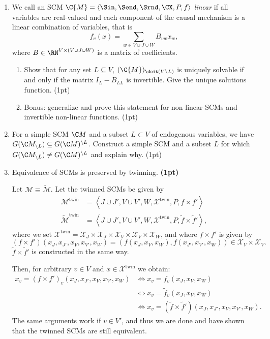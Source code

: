 \begin{enumerate}
\item We call an SCM $\C{M}=\langle \Sin, \Send, \Srnd, \CX, P, f \rangle$
\emph{linear} if all variables are real-valued and 
each component of the causal mechanism is a linear combination of variables, that is
$$
  f_v(x) = \sum_{w\in V \cup J \cup W} B_{vw} x_w,
$$
where $B\in\RN^{V \times (V \cup J \cup W)}$ is a matrix of coefficients.

\begin{enumerate}
\item Show that for any set $L \subseteq V$, $(\C{M})_{\doit(V\setminus L)}$ is uniquely solvable if and only if the matrix $I_{L}-B_{LL}$ is invertible. Give the unique solutions function. (1pt)
\item Bonus: generalize and prove this statement for non-linear SCMs and invertible non-linear functions. (1pt)
\end{enumerate}

\item For a simple SCM $\C M$ and a subset $L \subset V$ of endogenous variables, we have $G(\C M_{\setminus L}) \subseteq G(\C M)^{\setminus L}$. Construct a simple SCM and a subset $L$ for which $G(\C M_{\setminus L}) \neq G(\C M)^{\setminus L}$ and explain why. (1pt)

\item Equivalence of SCMs is preserved by twinning. \textbf{(1pt)}  
\begin{gradedsolution}
Let $\mathcal{M} \equiv \widetilde{\mathcal{M}}$. Let the twinned SCMs be given by
\begin{align*}
	\mathcal{M}^{\text{twin}} & = \left\langle J \cup J', V \cup V', W, \mathcal{X}^{\text{twin}}, P, f \times f' \right\rangle \\
	\widetilde{\mathcal{M}}^{\text{twin}} & = \left\langle J \cup J', V \cup V', W, \mathcal{X}^{\text{twin}}, P, \widetilde{f} \times \widetilde{f}' \right\rangle,
\end{align*}
where we set $\mathcal{X}^{\text{twin}} = \mathcal{X}_J \times \mathcal{X}_{J} \times \mathcal{X}_{V} \times \mathcal{X}_V \times \mathcal{X}_W$, and where $f \times f'$ is given by 
\begin{equation*}
	(f \times f')(x_J, x_{J'}, x_V, x_{V'}, x_W) = (f(x_J, x_V, x_W), f(x_{J'}, x_{V'}, x_W)) \in \mathcal{X}_V \times \mathcal{X}_{V}.
\end{equation*}
$\widetilde{f} \times \widetilde{f}'$ is constructed in the same way. 

Then, for arbitrary $v \in V$ and $x \in \mathcal{X}^{\text{twin}}$ we obtain:
\begin{align*}
	x_v = (f \times f')_v(x_J, x_{J'}, x_V, x_{V'}, x_W) & \Longleftrightarrow x_v = f_v(x_J, x_V, x_W) \\
	& \Longleftrightarrow x_v = \widetilde{f}_v(x_J, x_V, x_W) \\
	& \Longleftrightarrow x_v = (\widetilde{f} \times \widetilde{f}')(x_J, x_{J'}, x_V, x_{V'}, x_W).
\end{align*}
The same arguments work if $v \in V'$, and thus we are done and have shown that the twinned SCMs are still equivalent.
\end{gradedsolution}


\end{enumerate}
